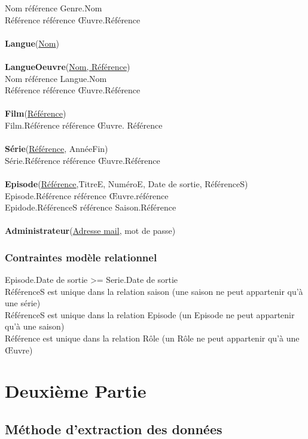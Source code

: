 \documentclass[10pt,a4paper]{article}
\begin{document}
		Nom référence Genre.Nom
    \\
		Référence référence Œuvre.Référence
\\
\\
\textbf{Langue}(\underline{Nom})
\\
\\
\textbf{LangueOeuvre}(\underline{Nom, Référence})
\\
	Nom référence Langue.Nom
    \\
	Référence référence Œuvre.Référence
\\
\\
\textbf{Film}(\underline{Référence})
\\
	Film.Référence référence Œuvre. Référence
\\
\\
\textbf{Série}(\underline{Référence}, AnnéeFin)
\\
	Série.Référence référence Œuvre.Référence
\\
\\
\textbf{Episode}(\underline{Référence},TitreE, NuméroE, Date de sortie, RéférenceS)
\\
		Episode.Référence référence Œuvre.référence
        \\
		Epidode.RéférenceS référence Saison.Référence
\\
\\
\textbf{Administrateur}(\underline{Adresse mail}, mot de passe)
\subsubsection{Contraintes modèle relationnel}
\noindent Episode.Date de sortie >= Serie.Date de sortie \\
RéférenceS est unique dans la relation saison (une saison ne peut appartenir qu’à une série) \\
RéférenceS est unique dans la relation Episode (un Episode ne peut appartenir qu’à une saison) \\
Référence est unique dans la relation Rôle (un Rôle ne peut appartenir qu’à une Œuvre)

\newpage
\section{Deuxième Partie}\label{deuxieme partie}

\subsection{Méthode d'extraction des données}
\end{document}
